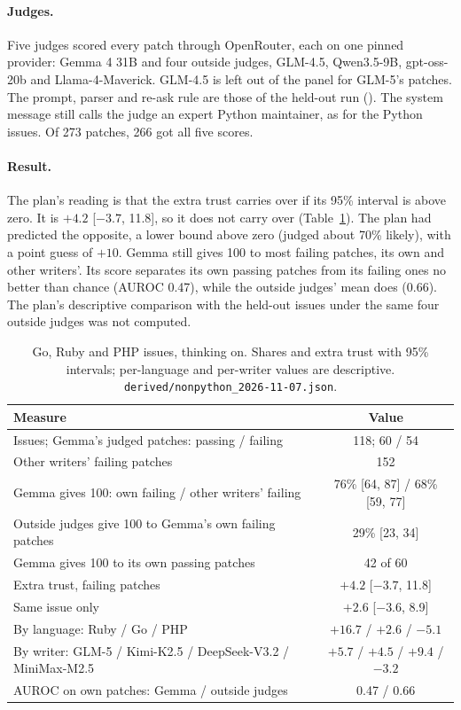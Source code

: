 \documentclass[10pt,letterpaper]{article}
\begin{document}
\paragraph{Judges.} Five judges scored every patch through OpenRouter, each on one pinned provider: Gemma 4 31B and
four outside judges, GLM-4.5, Qwen3.5-9B, gpt-oss-20b and Llama-4-Maverick. GLM-4.5 is left out of the panel for
GLM-5's patches. The prompt, parser and re-ask rule are those of the held-out run ().
The system message still calls the judge an expert Python maintainer, as for the Python issues. Of 273 patches, 266
got all five scores.

\paragraph{Result.} The plan's reading is that the extra trust carries over if its 95\% interval is above zero. It is
$+4.2$ [$-3.7$, 11.8], so it does not carry over (Table~\ref{tab:np}). The plan had predicted the opposite, a lower
bound above zero (judged about 70\% likely), with a point guess of $+10$. Gemma still gives 100 to most failing
patches, its own and other writers'. Its score separates its own passing patches from its failing ones no better than
chance (AUROC 0.47), while the outside judges' mean does (0.66). The plan's descriptive comparison with the held-out
issues under the same four outside judges was not computed.

\begin{table}[H]
\centering
\small
\caption{Go, Ruby and PHP issues, thinking on. Shares and extra trust with 95\% intervals; per-language and per-writer
values are descriptive. \texttt{derived/nonpython\_2026-11-07.json}.}
\label{tab:np}
\begin{tabular}{@{}lc@{}}
\toprule
Measure & Value \\
\midrule
Issues; Gemma's judged patches: passing / failing & 118; 60 / 54 \\
Other writers' failing patches & 152 \\
Gemma gives 100: own failing / other writers' failing & 76\% [64, 87] / 68\% [59, 77] \\
Outside judges give 100 to Gemma's own failing patches & 29\% [23, 34] \\
Gemma gives 100 to its own passing patches & 42 of 60 \\
Extra trust, failing patches & $+4.2$ [$-3.7$, 11.8] \\
Same issue only & $+2.6$ [$-3.6$, 8.9] \\
By language: Ruby / Go / PHP & $+16.7$ / $+2.6$ / $-5.1$ \\
By writer: GLM-5 / Kimi-K2.5 / DeepSeek-V3.2 / MiniMax-M2.5 & $+5.7$ / $+4.5$ / $+9.4$ / $-3.2$ \\
AUROC on own patches: Gemma / outside judges & 0.47 / 0.66 \\
\bottomrule
\end{tabular}
\end{table}
\end{document}
